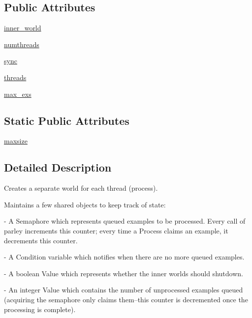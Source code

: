 \subsection*{Public Attributes}
\begin{DoxyCompactItemize}
\item 
\hyperlink{classparlai_1_1core_1_1worlds_1_1HogwildWorld_a4138f2e9cd59f349ac7b737256faf383}{inner\+\_\+world}
\item 
\hyperlink{classparlai_1_1core_1_1worlds_1_1HogwildWorld_adce46f602b3dbfb1b2aaaf2abfd502d6}{numthreads}
\item 
\hyperlink{classparlai_1_1core_1_1worlds_1_1HogwildWorld_abe0b40ea70c93221f9f2541cb6089c60}{sync}
\item 
\hyperlink{classparlai_1_1core_1_1worlds_1_1HogwildWorld_a16d58ef1f8d81bae98e7f99e268ef9b4}{threads}
\item 
\hyperlink{classparlai_1_1core_1_1worlds_1_1HogwildWorld_a0224a6c9e173d699a7da6ebe1451f3a6}{max\+\_\+exs}
\end{DoxyCompactItemize}
\subsection*{Static Public Attributes}
\begin{DoxyCompactItemize}
\item 
\hyperlink{classparlai_1_1core_1_1worlds_1_1HogwildWorld_a5465066ad260dd6f8aeb648bb3088cd5}{maxsize}
\end{DoxyCompactItemize}


\subsection{Detailed Description}
\begin{DoxyVerb}Creates a separate world for each thread (process).

Maintains a few shared objects to keep track of state:

- A Semaphore which represents queued examples to be processed. Every call
  of parley increments this counter; every time a Process claims an
  example, it decrements this counter.

- A Condition variable which notifies when there are no more queued
  examples.

- A boolean Value which represents whether the inner worlds should shutdown.

- An integer Value which contains the number of unprocessed examples queued
  (acquiring the semaphore only claims them--this counter is decremented
  once the processing is complete).
\end{DoxyVerb}
 

